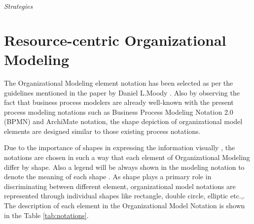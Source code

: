 \textit{Strategies}         \\




\section{Resource-centric Organizational Modeling}
 The Organizational Modeling element notation has been selected as per the guidelines mentioned in the paper by Daniel L.Moody \cite{Moody2009}. Also by observing  the fact that business process modelers are already well-known with the present process modeling notations such as Business Process Modeling Notation 2.0 (BPMN) \cite{bpm2011} and ArchiMate notation\cite{arc2013}, the shape depiction of organizational model elements are designed similar to those existing process notations. 

 Due to the importance of shapes in expressing the information visually , the notations are chosen in such a way that each element of Organizational Modeling  differ by shape. Also a legend will be always shown in the modeling notation to denote the meaning of each shape \cite{Moody2009}. As shape plays a primary role in discriminating between different element, organizational model notations are represented through individual shapes like rectangle, double circle, elliptic etc.,. The description of each element in the Organizational Model Notation is shown in the Table \ref{tab:notations}. 

